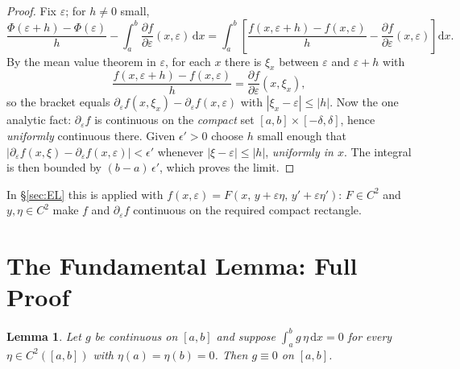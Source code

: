 \documentclass[11pt]{article}
\theoremstyle{plain}
\newtheorem{lemma}[theorem]{Lemma}
\theoremstyle{definition}
\theoremstyle{remark}
\newcommand{\dd}{\mathrm{d}}
\newcommand{\pd}[2]{\frac{\partial #1}{\partial #2}}
\begin{document}
\begin{proof}
Fix $\varepsilon$; for $h \neq 0$ small,
\begin{equation}
  \frac{\Phi(\varepsilon+h)-\Phi(\varepsilon)}{h}
  - \int_a^b \pd f\varepsilon(x,\varepsilon)\,\dd x
  = \int_a^b \left[\frac{f(x,\varepsilon+h) - f(x,\varepsilon)}{h}
  - \pd f\varepsilon(x,\varepsilon)\right]\dd x .
\end{equation}
By the mean value theorem in $\varepsilon$, for each $x$ there is
$\xi_x$ between $\varepsilon$ and $\varepsilon+h$ with
\begin{equation}
  \frac{f(x,\varepsilon+h)-f(x,\varepsilon)}{h}
  = \pd f\varepsilon(x, \xi_x),
\end{equation}
so the bracket equals
$\partial_\varepsilon f(x,\xi_x) - \partial_\varepsilon f(x,\varepsilon)$
with $|\xi_x - \varepsilon| \le |h|$. Now the one analytic fact:
$\partial_\varepsilon f$ is continuous on the \emph{compact} set
$[a,b]\times[-\delta,\delta]$, hence \emph{uniformly} continuous there.
Given $\epsilon' > 0$ choose $h$ small enough that
$|\partial_\varepsilon f(x,\xi) - \partial_\varepsilon f(x,\varepsilon)|
< \epsilon'$ whenever $|\xi - \varepsilon| \le |h|$, \emph{uniformly in
$x$}. The integral is then bounded by $(b-a)\,\epsilon'$, which proves the
limit.
\end{proof}

In \S\ref{sec:EL} this is applied with
$f(x,\varepsilon) = F(x,\, y+\varepsilon\eta,\, y'+\varepsilon\eta')$:
$F \in C^2$ and $y, \eta \in C^2$ make $f$ and $\partial_\varepsilon f$
continuous on the required compact rectangle.

\section{The Fundamental Lemma: Full Proof}
\label{app:fundamental-lemma}

\begin{lemma}
Let $g$ be continuous on $[a,b]$ and suppose
$\int_a^b g\,\eta\,\dd x = 0$ for every $\eta \in C^2([a,b])$ with
$\eta(a)=\eta(b)=0$. Then $g \equiv 0$ on $[a,b]$.
\end{lemma}
\end{document}
